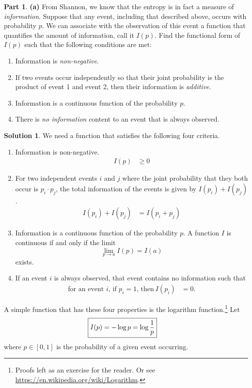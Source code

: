 \documentclass[11pt]{article}
\theoremstyle{definition}
\newtheorem{question}{Part}[section]
\newtheorem*{solution}{Solution}
\numberwithin{equation}{section}
\numberwithin{figure}{section}
\begin{document}
\begin{question}
\textbf{(a)} From Shannon, we know that the entropy is in fact a measure of \textit{information}. Suppose that any event, including that described above, occurs with probability $p$. We can associate with the observation of this event a function that quantifies the amount of information, call it $I(p)$. Find the functional form of $I(p)$ such that the following conditions are met:
\begin{enumerate}
\item Information is \textit{non-negative}.
\item If two events occur independently so that their joint probability is the product of event 1 and event 2, then their information is \textit{additive}.
\item Information is a continuous function of the probability $p$.
\item There is \textit{no information} content to an event that is always observed.
\end{enumerate}
\end{question}

\begin{solution}
We need a function that satisfies the following four criteria.
\begin{enumerate}
\item Information is non-negative.
\begin{align}
I(p) & \geq 0
\end{align}

\item For two independent events $i$ and $j$ where the joint probability that they both occur is $p_i \cdot p_j$, the total information of the events is given by $I(p_i) + I(p_j)$.
\begin{align}
I(p_i) + I(p_j) & = I(p_i + p_j)
\end{align}

\item Information is a continuous function of the probability $p$. A function $I$ is continuous if and only if the limit
\begin{equation}
\lim_{p \to a} I(p) = I(a)
\end{equation}
exists.

\item If an event $i$ is always observed, that event contains no information such that
\begin{align}
\text{for an event $i$, if $p_i = 1$, then}\  I(p_i)& = 0.
\end{align}
\end{enumerate}
A simple function that has these four properties is the logarithm function.\footnote{Proofs left as an exercise for the reader. Or see \url{https://en.wikipedia.org/wiki/Logarithm}.} Let
\begin{align}
\Aboxed{I(p) & = - \log{p} = \log{\frac{1}{p}}}\label{eq:info}
\end{align}
where $p \in [0,1]$ is the probability of a given event occurring.
\end{solution}
\end{document}
